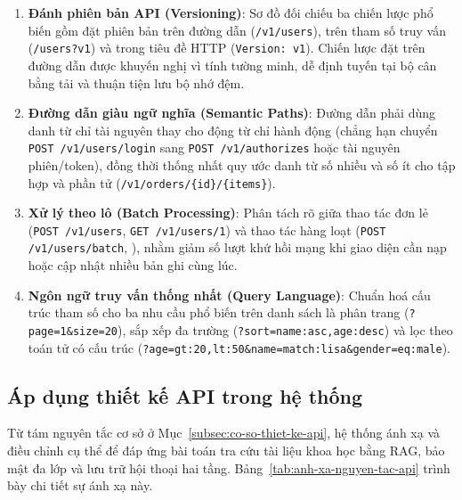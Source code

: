 \begin{enumerate}
    \item \textbf{Đánh phiên bản API (Versioning)}: Sơ đồ đối chiếu ba chiến lược phổ biến gồm đặt phiên bản trên đường dẫn (\texttt{/v1/users}), trên tham số truy vấn (\texttt{/users?v1}) và trong tiêu đề HTTP (\texttt{Version: v1}). Chiến lược đặt trên đường dẫn được khuyến nghị vì tính tường minh, dễ định tuyến tại bộ cân bằng tải và thuận tiện lưu bộ nhớ đệm.
    \item \textbf{Đường dẫn giàu ngữ nghĩa (Semantic Paths)}: Đường dẫn phải dùng danh từ chỉ tài nguyên thay cho động từ chỉ hành động (chẳng hạn chuyển \texttt{POST /v1/users/login} sang \texttt{POST /v1/authorizes} hoặc tài nguyên phiên/token), đồng thời thống nhất quy ước danh từ số nhiều và số ít cho tập hợp và phần tử (\texttt{/v1/orders/\{id\}/\{items\}}).
    \item \textbf{Xử lý theo lô (Batch Processing)}: Phân tách rõ giữa thao tác đơn lẻ (\texttt{POST /v1/users}, \texttt{GET /v1/users/1}) và thao tác hàng loạt ({\small\texttt{POST /v1/users/batch}}, ), nhằm giảm số lượt khứ hồi mạng khi giao diện cần nạp hoặc cập nhật nhiều bản ghi cùng lúc.
    \item \textbf{Ngôn ngữ truy vấn thống nhất (Query Language)}: Chuẩn hoá cấu trúc tham số cho ba nhu cầu phổ biến trên danh sách là phân trang (\texttt{?page=1\&size=20}), sắp xếp đa trường ({\small\texttt{?sort=name:asc,}\allowbreak\texttt{age:desc}}) và lọc theo toán tử có cấu trúc ({\small\texttt{?age=gt:20,lt:50}\allowbreak\texttt{\&name=match:lisa}\allowbreak\texttt{\&gender=eq:male}}).
\end{enumerate}

\subsection{Áp dụng thiết kế API trong hệ thống}
\label{subsec:ap-dung-thiet-ke-api}

Từ tám nguyên tắc cơ sở ở Mục~\ref{subsec:co-so-thiet-ke-api}, hệ thống ánh xạ và điều chỉnh cụ thể để đáp ứng bài toán tra cứu tài liệu khoa học bằng RAG, bảo mật đa lớp và lưu trữ hội thoại hai tầng. Bảng~\ref{tab:anh-xa-nguyen-tac-api} trình bày chi tiết sự ánh xạ này.

